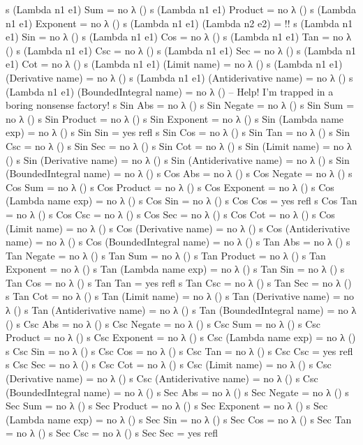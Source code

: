 \documentclass{report}
\begin{document}
\begin{code}
  s (Lambda n1 e1) Sum = no λ ()
  s (Lambda n1 e1) Product = no λ ()
  s (Lambda n1 e1) Exponent = no λ ()
  s (Lambda n1 e1) (Lambda n2 e2) = {!!}
  s (Lambda n1 e1) Sin = no λ ()
  s (Lambda n1 e1) Cos = no λ ()
  s (Lambda n1 e1) Tan = no λ ()
  s (Lambda n1 e1) Csc = no λ ()
  s (Lambda n1 e1) Sec = no λ ()
  s (Lambda n1 e1) Cot = no λ ()
  s (Lambda n1 e1) (Limit name) = no λ ()
  s (Lambda n1 e1) (Derivative name) = no λ ()
  s (Lambda n1 e1) (Antiderivative name) = no λ ()
  s (Lambda n1 e1) (BoundedIntegral name) = no λ ()
  -- Help!  I'm trapped in a boring nonsense factory!
  s Sin Abs = no λ ()
  s Sin Negate = no λ ()
  s Sin Sum = no λ ()
  s Sin Product = no λ ()
  s Sin Exponent = no λ ()
  s Sin (Lambda name exp) = no λ ()
  s Sin Sin = yes refl
  s Sin Cos = no λ ()
  s Sin Tan = no λ ()
  s Sin Csc = no λ ()
  s Sin Sec = no λ ()
  s Sin Cot = no λ ()
  s Sin (Limit name) = no λ ()
  s Sin (Derivative name) = no λ ()
  s Sin (Antiderivative name) = no λ ()
  s Sin (BoundedIntegral name) = no λ ()
  s Cos Abs = no λ ()
  s Cos Negate = no λ ()
  s Cos Sum = no λ ()
  s Cos Product = no λ ()
  s Cos Exponent = no λ ()
  s Cos (Lambda name exp) = no λ ()
  s Cos Sin = no λ ()
  s Cos Cos = yes refl
  s Cos Tan = no λ ()
  s Cos Csc = no λ ()
  s Cos Sec = no λ ()
  s Cos Cot = no λ ()
  s Cos (Limit name) = no λ ()
  s Cos (Derivative name) = no λ ()
  s Cos (Antiderivative name) = no λ ()
  s Cos (BoundedIntegral name) = no λ ()
  s Tan Abs = no λ ()
  s Tan Negate = no λ ()
  s Tan Sum = no λ ()
  s Tan Product = no λ ()
  s Tan Exponent = no λ ()
  s Tan (Lambda name exp) = no λ ()
  s Tan Sin = no λ ()
  s Tan Cos = no λ ()
  s Tan Tan = yes refl
  s Tan Csc = no λ ()
  s Tan Sec = no λ ()
  s Tan Cot = no λ ()
  s Tan (Limit name) = no λ ()
  s Tan (Derivative name) = no λ ()
  s Tan (Antiderivative name) = no λ ()
  s Tan (BoundedIntegral name) = no λ ()
  s Csc Abs = no λ ()
  s Csc Negate = no λ ()
  s Csc Sum = no λ ()
  s Csc Product = no λ ()
  s Csc Exponent = no λ ()
  s Csc (Lambda name exp) = no λ ()
  s Csc Sin = no λ ()
  s Csc Cos = no λ ()
  s Csc Tan = no λ ()
  s Csc Csc = yes refl
  s Csc Sec = no λ ()
  s Csc Cot = no λ ()
  s Csc (Limit name) = no λ ()
  s Csc (Derivative name) = no λ ()
  s Csc (Antiderivative name) = no λ ()
  s Csc (BoundedIntegral name) = no λ ()
  s Sec Abs = no λ ()
  s Sec Negate = no λ ()
  s Sec Sum = no λ ()
  s Sec Product = no λ ()
  s Sec Exponent = no λ ()
  s Sec (Lambda name exp) = no λ ()
  s Sec Sin = no λ ()
  s Sec Cos = no λ ()
  s Sec Tan = no λ ()
  s Sec Csc = no λ ()
  s Sec Sec = yes refl

\end{code}
\end{document}
